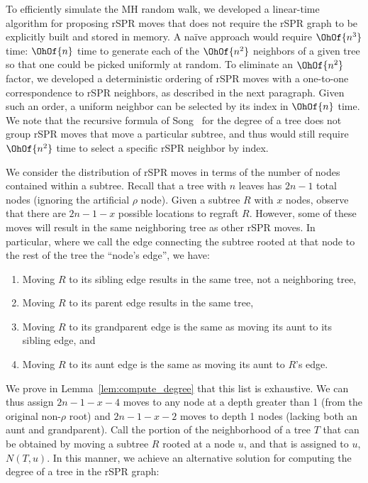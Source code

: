 \documentclass[11pt,onecolumn,conference]{IEEEtran}
\begin{document}
To efficiently simulate the MH random walk, we developed a linear-time algorithm for proposing rSPR moves that does not require the rSPR graph to be explicitly built and stored in memory.
A na\"ive approach would require $\OhOf{n^3}$ time: $\OhOf{n}$ time to generate each of the $\OhOf{n^2}$ neighbors of a given tree so that one could be picked uniformly at random.
To eliminate an $\OhOf{n^2}$ factor, we developed a deterministic ordering of rSPR moves with a one-to-one correspondence to rSPR neighbors, as described in the next paragraph.
Given such an order, a uniform neighbor can be selected by its index in $\OhOf{n}$ time.
We note that the recursive formula of Song~\cite{Song2003-gf} for the degree of a tree does not group rSPR moves that move a particular subtree, and thus would still require $\OhOf{n^2}$ time to select a specific rSPR neighbor by index.

We consider the distribution of rSPR moves in terms of the number of nodes contained within a subtree.
Recall that a tree with $n$ leaves has $2n-1$ total nodes (ignoring the artificial $\rho$ node).
Given a subtree $R$ with $x$ nodes, observe that there are $2n-1 - x$ possible locations to regraft $R$.
However, some of these moves will result in the same neighboring tree as other rSPR moves.
In particular, where we call the edge connecting the subtree rooted at that node to the rest of the tree the ``node's edge'', we have:
\begin{enumerate}
\item Moving $R$ to its sibling edge results in the same tree, not a neighboring tree,
\item Moving $R$ to its parent edge results in the same tree,
\item Moving $R$ to its grandparent edge is the same as moving its aunt to its sibling edge, and
\item Moving $R$ to its aunt edge is the same as moving its aunt to $R$'s edge.
\end{enumerate}
We prove in Lemma~\ref{lem:compute_degree} that this list is exhaustive.
We can thus assign $2n-1-x-4$ moves to any node at a depth greater than 1 (from the original non-$\rho$ root) and $2n-1-x-2$ moves to depth 1 nodes (lacking both an aunt and grandparent).
Call the portion of the neighborhood of a tree $T$ that can be obtained by moving a subtree $R$ rooted at a node $u$, and that is assigned to $u$, $N(T,u)$.
In this manner, we achieve an alternative solution for computing the degree of a tree in the rSPR graph:
\end{document}
